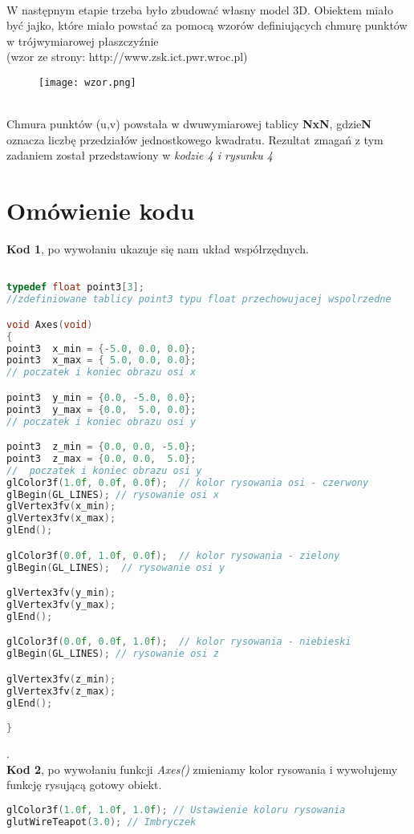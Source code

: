 \documentclass[a4paper,11pt]{article}
\begin{document}
\\W następnym etapie trzeba było zbudować własny model 3D. Obiektem miało być jajko, które miało powstać za pomocą wzorów definiujących chmurę punktów w trójwymiarowej płaszczyźnie
\\ (wzor ze strony: http://www.zsk.ict.pwr.wroc.pl)
  \begin{figure}[h!]
      \centering
      \texttt{[image: wzor.png]}
      \label{fig:zrzut1}
    \end{figure}
\\Chmura punktów (u,v) powstała w dwuwymiarowej tablicy \textbf{NxN}, gdzie\textbf{N} oznacza liczbę przedziałów jednostkowego kwadratu. Rezultat zmagań z tym zadaniem został przedstawiony w \textit{kodzie 4 i rysunku 4}

  \section{Omówienie kodu}
   \textbf{Kod 1}, po wywołaniu ukazuje się nam układ współrzędnych.  
{\small
\begin{lstlisting}[language=C++]

typedef float point3[3]; 
//zdefiniowane tablicy point3 typu float przechowujacej wspolrzedne

void Axes(void)
{
point3  x_min = {-5.0, 0.0, 0.0};
point3  x_max = { 5.0, 0.0, 0.0}; 
// poczatek i koniec obrazu osi x

point3  y_min = {0.0, -5.0, 0.0}; 
point3  y_max = {0.0,  5.0, 0.0};
// poczatek i koniec obrazu osi y

point3  z_min = {0.0, 0.0, -5.0};
point3  z_max = {0.0, 0.0,  5.0};
//  poczatek i koniec obrazu osi y
glColor3f(1.0f, 0.0f, 0.0f);  // kolor rysowania osi - czerwony
glBegin(GL_LINES); // rysowanie osi x
glVertex3fv(x_min);
glVertex3fv(x_max);
glEnd();

glColor3f(0.0f, 1.0f, 0.0f);  // kolor rysowania - zielony
glBegin(GL_LINES);  // rysowanie osi y

glVertex3fv(y_min);
glVertex3fv(y_max);                           
glEnd();

glColor3f(0.0f, 0.0f, 1.0f);  // kolor rysowania - niebieski
glBegin(GL_LINES); // rysowanie osi z

glVertex3fv(z_min);
glVertex3fv(z_max);
glEnd();

}
\end{lstlisting}
}
.\\
\textbf{Kod 2}, po wywołaniu funkcji \textit{Axes()} zmieniamy kolor rysowania i wywołujemy funkcję rysującą gotowy obiekt. 
{\small
\begin{lstlisting}[language=C++]
glColor3f(1.0f, 1.0f, 1.0f); // Ustawienie koloru rysowania
glutWireTeapot(3.0); // Imbryczek
\end{lstlisting}
}
\end{document}
